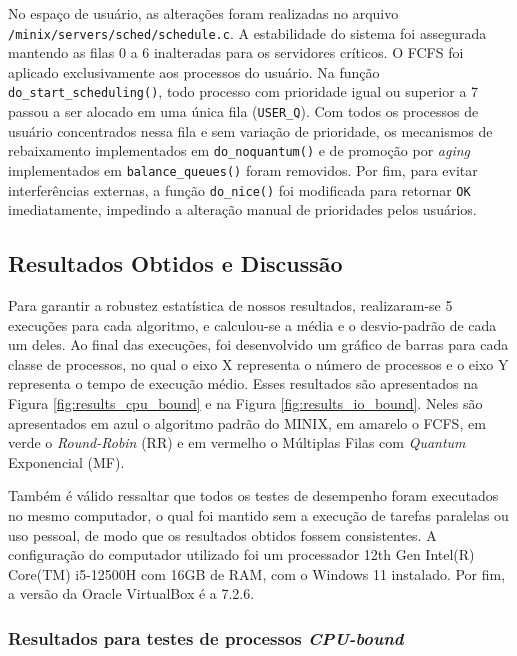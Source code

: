 \documentclass[12pt]{article}
\begin{document}
No espaço de usuário, as alterações foram realizadas no arquivo \texttt{/minix/servers/sched/schedule.c}. A estabilidade do sistema foi assegurada mantendo as filas 0 a 6 inalteradas para os servidores críticos. O FCFS foi aplicado exclusivamente aos processos do usuário. Na função \texttt{do\_start\_scheduling()}, todo processo com prioridade igual ou superior a 7 passou a ser alocado em uma única fila (\texttt{USER\_Q}). Com todos os processos de usuário concentrados nessa fila e sem variação de prioridade, os mecanismos de rebaixamento implementados em \texttt{do\_noquantum()} e de promoção por \textit{aging} implementados em \texttt{balance\_queues()} foram removidos. Por fim, para evitar interferências externas, a função \texttt{do\_nice()} foi modificada para retornar \texttt{OK} imediatamente, impedindo a alteração manual de prioridades pelos usuários.

\subsection{Resultados Obtidos e Discussão}
Para garantir a robustez estatística de nossos resultados, realizaram-se 5 execuções para cada algoritmo, e calculou-se a média e o desvio-padrão de cada um deles. Ao final
das execuções, foi desenvolvido um gráfico de barras para cada classe de processos, no qual o eixo X representa o número de processos e o eixo Y representa o tempo de execução médio. Esses resultados são apresentados na Figura \ref{fig:results_cpu_bound} e na Figura \ref{fig:results_io_bound}. Neles são apresentados em azul o algoritmo padrão do MINIX, em amarelo o FCFS, em verde o \textit{Round-Robin} (RR) e em vermelho o Múltiplas Filas com \textit{Quantum} Exponencial (MF).

Também é válido ressaltar que todos os testes de desempenho foram executados no mesmo computador, o qual foi mantido sem a execução de tarefas paralelas ou uso pessoal, de modo que os resultados obtidos fossem consistentes. 
A configuração do computador utilizado foi um processador 12th Gen Intel(R) Core(TM) i5-12500H com 16GB de RAM, com o Windows 11 instalado. Por fim, a versão da Oracle VirtualBox é a 7.2.6.
\vspace{-10pt}
\subsubsection{Resultados para testes de processos \textit{CPU-bound}}
\vspace{-20pt}
\end{document}
